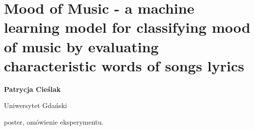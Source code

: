 \documentclass[\main/boa.tex]{subfiles}
\begin{document}
\section{Mood of Music - a machine learning model for classifying mood of music by evaluating characteristic words of songs lyrics}

\begin{minipage}{0.915\textwidth}
	\centering
  {\bf {}  Patrycja Cieślak}
\end{minipage}

\vskip 0.3cm

\begin{affiliations}
\begin{minipage}{0.915\textwidth}
\centering
Uniwersytet Gdański  \\[-2pt]
\end{minipage}
\end{affiliations}

\vskip 0.8cm

 poster, omówienie eksperymentu. 
\end{document}

